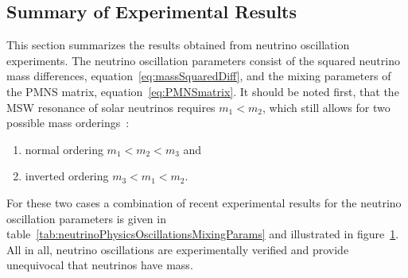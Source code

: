 \subsection{Summary of Experimental Results}
\label{sec:neutrinoPhysicsOscillationsMixingParams}
This section summarizes the results obtained from neutrino oscillation experiments. The neutrino oscillation parameters consist of the squared neutrino mass differences, equation~\eqref{eq:massSquaredDiff}, and the mixing parameters of the PMNS matrix, equation~\eqref{eq:PMNSmatrix}. It should be noted first, that the MSW resonance of solar neutrinos requires $m_1 < m_2$, which still allows for two possible mass orderings~\cite{zuber2011neutrino}:
\begin{enumerate}
    \item normal ordering $m_1 < m_2 < m_3$ and
    \item inverted ordering $m_3 < m_1 < m_2$.
\end{enumerate}
For these two cases a combination of recent experimental results for the neutrino oscillation parameters is given in table~\ref{tab:neutrinoPhysicsOscillationsMixingParams} and illustrated in figure~\ref{fig:neutrinoPhysicsOscillationsMixingParams}. All in all, neutrino oscillations are experimentally verified and provide unequivocal that neutrinos have mass.
\FloatBarrier
\begin{figure}[t]
	\label{fig:neutrinoPhysicsOscillationsMixingParams}
\end{figure}


